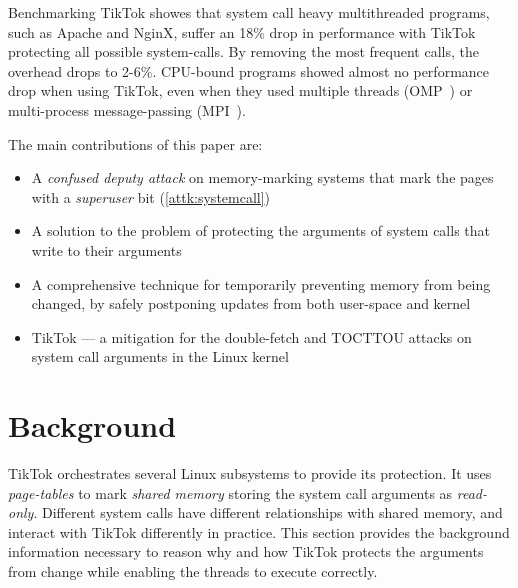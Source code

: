 \documentclass[conference]{IEEEtran}
\newcommand{\sysname}{TikTok}
\newcommand{\roughevaloverheadbad}{18\%}
\newcommand{\roughevaloverheadbetter}{2-6\%}
\begin{document}

Benchmarking \sysname{} showes that system call heavy multithreaded programs,
such as Apache and NginX, suffer an \roughevaloverheadbad{} drop in performance
with \sysname{} protecting all possible system-calls. By removing the
most frequent calls, the overhead drops to \roughevaloverheadbetter{}. CPU-bound
programs showed almost no performance drop when using \sysname{}, even when they
used multiple threads (OMP~\cite{dagum1998openmp}) or multi-process
message-passing (MPI~\cite{snir1998mpi}).



The main contributions of this paper are:

\begin{itemize}

\item A \emph{confused deputy attack} on memory-marking systems that mark the pages with a \emph{superuser} bit (\autoref{attk:systemcall})
\item A solution to the problem of protecting the arguments of system calls that write to their arguments
\item A comprehensive technique for temporarily preventing memory from being changed, by safely
      postponing updates from both user-space and kernel
\item \sysname{} --- a mitigation for the double-fetch and TOCTTOU attacks on system
      call arguments in the Linux kernel
\end{itemize}

\section{Background}
\label{sec:background}

\sysname{} orchestrates several Linux subsystems to provide its protection. It uses
\emph{page-tables} to mark \emph{shared memory} storing the system call
arguments as \emph{read-only}. Different system calls have different
relationships with shared memory, and interact with \sysname{} differently in
practice. This section provides the background information necessary to reason
why and how \sysname{} protects the arguments from change while enabling the threads to
execute correctly.
\end{document}
